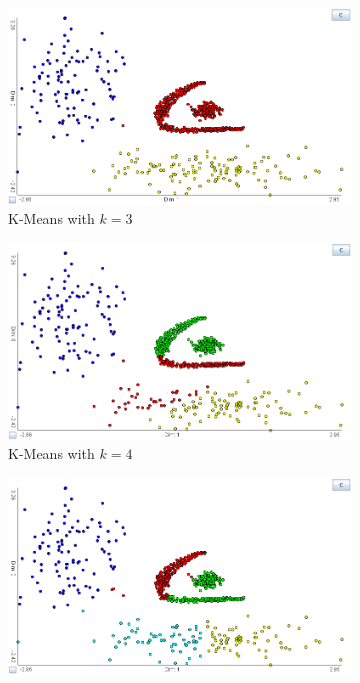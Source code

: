 \documentclass[
	a4paper,
	english,
	twoside,
	openright,               
	11pt                            
	]{report}
\begin{document}
\begin{figure}[h]
\centering
\begin{subfigure}[t]{.49\textwidth}
  \centering
  \includegraphics[width=.95\linewidth]{unob_k3}
  \caption{K-Means with $k=3$}
  \label{fig:unob_k3}
\end{subfigure}
\hfill
\begin{subfigure}[t]{.49\textwidth}
  \centering
  \includegraphics[width=.95\linewidth]{unob_k4ex}
  \caption{K-Means with $k=4$}
  \label{fig:unob_k4ex}
\end{subfigure}
\medskip
\begin{subfigure}[t]{.49\textwidth}
  \centering
  \includegraphics[width=.95\linewidth]{unob_k5ex}

\end{subfigure}
\end{figure}
\end{document}
